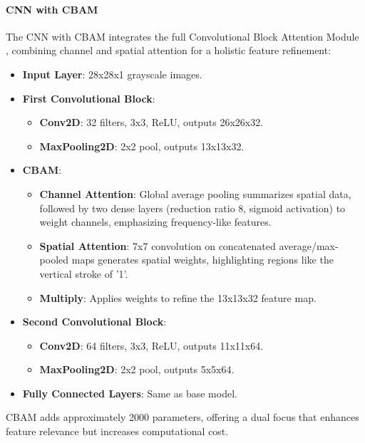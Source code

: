 \documentclass[12pt]{article}
\begin{document}
\paragraph{CNN with CBAM}
The CNN with CBAM integrates the full Convolutional Block Attention Module \cite{cbam_paper}, combining channel and spatial attention for a holistic feature refinement:
\begin{itemize}
    \item \textbf{Input Layer}: 28x28x1 grayscale images.
    \item \textbf{First Convolutional Block}:
        \begin{itemize}
            \item \textbf{Conv2D}: 32 filters, 3x3, ReLU, outputs 26x26x32.
            \item \textbf{MaxPooling2D}: 2x2 pool, outputs 13x13x32.
        \end{itemize}
    \item \textbf{CBAM}:
        \begin{itemize}
            \item \textbf{Channel Attention}: Global average pooling summarizes spatial data, followed by two dense layers (reduction ratio 8, sigmoid activation) to weight channels, emphasizing frequency-like features.
            \item \textbf{Spatial Attention}: 7x7 convolution on concatenated average/max-pooled maps generates spatial weights, highlighting regions like the vertical stroke of '1'.
            \item \textbf{Multiply}: Applies weights to refine the 13x13x32 feature map.
        \end{itemize}
    \item \textbf{Second Convolutional Block}:
        \begin{itemize}
            \item \textbf{Conv2D}: 64 filters, 3x3, ReLU, outputs 11x11x64.
            \item \textbf{MaxPooling2D}: 2x2 pool, outputs 5x5x64.
        \end{itemize}
    \item \textbf{Fully Connected Layers}: Same as base model.
\end{itemize}
CBAM adds approximately 2000 parameters, offering a dual focus that enhances feature relevance but increases computational cost.
\end{document}
